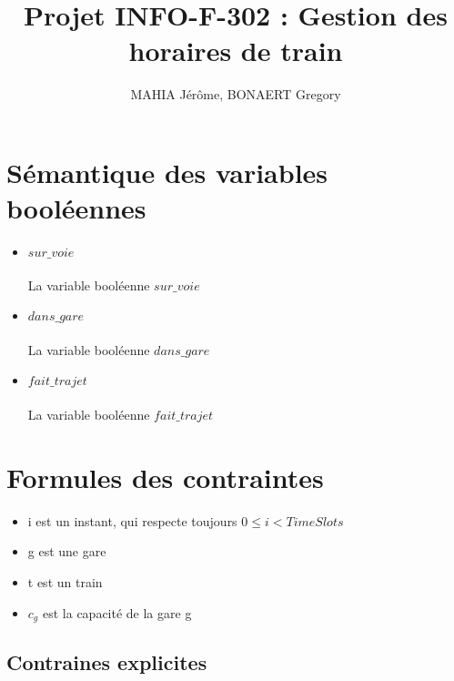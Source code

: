 \documentclass[a4paper]{article}
\title{Projet INFO-F-302 : Gestion des horaires de train}
\author{MAHIA Jérôme, BONAERT Gregory}
\begin{document}
\maketitle

\section{Sémantique des variables booléennes}

\begin{itemize}
\item $sur\_voie$ 
\\
\\
La variable booléenne $sur\_voie$
\item $dans\_gare$
\\
\\
La variable booléenne $dans\_gare$
\item $fait\_trajet$
\\
\\
La variable booléenne $fait\_trajet$
\end{itemize}


\section{Formules des contraintes}


\begin{itemize}
\item i est un instant, qui respecte toujours $0 \leq i < TimeSlots$
\item g est une gare
\item t est un train
\item $c_g$ est la capacité de la gare g
\end{itemize}

\subsection{Contraines explicites}
\end{document}
